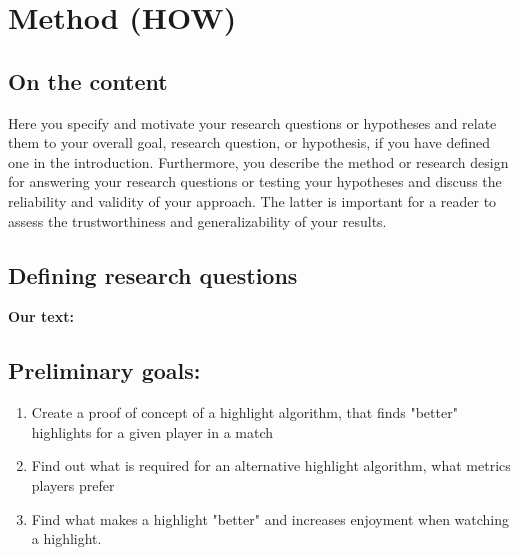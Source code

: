 
\chapter{Method (HOW)}
\label{chp:method}
\section{On the content}
Here you specify and motivate your research questions or hypotheses and relate them to your overall goal, research question, or hypothesis, if you have defined one in the introduction. Furthermore, you describe the method or research design for answering your research questions or testing your hypotheses and discuss the reliability and validity of your approach. The latter is important for a reader to assess the trustworthiness and generalizability of your results.  


\section{Defining research questions}
\textbf{Our text:}\\
\section{Preliminary goals:}
\normalsize
\begin{enumerate}[label=PG\arabic*., leftmargin=*]
    \item Create a proof of concept of a highlight algorithm, that finds "better" highlights for a given player in a match
    \item Find out what is required for an alternative highlight algorithm, what metrics players prefer
    \item Find what makes a highlight "better" and increases enjoyment when watching a highlight.
\end{enumerate}

